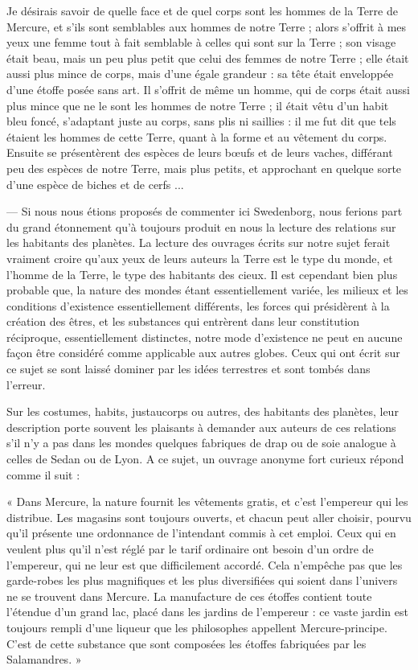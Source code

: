 \documentclass[a4paper, 11pt, oneside]{article}
\begin{document}
Je désirais savoir de quelle face et de quel corps sont les hommes de la Terre de Mercure, et s'ils sont semblables aux hommes de notre Terre ; alors s'offrit à mes yeux une femme tout à fait semblable à celles qui sont sur la Terre ; son visage était beau, mais un peu plus petit que celui des femmes de notre Terre ; elle était aussi plus mince de corps, mais d'une égale grandeur : sa tête était enveloppée d'une étoffe posée sans art. Il s'offrit de même un homme, qui de corps était aussi plus mince que ne le sont les hommes de notre Terre ; il était vêtu d'un habit bleu foncé, s'adaptant juste au corps, sans plis ni saillies : il me fut dit que tels étaient les hommes de cette Terre, quant à la forme et au vêtement du corps. Ensuite se présentèrent des espèces de leurs bœufs et de leurs vaches, différant peu des espèces de notre Terre, mais plus petits, et approchant en quelque sorte d'une espèce de biches et de cerfs ...

--- Si nous nous étions proposés de commenter ici Swedenborg, nous ferions part du grand étonnement qu'à toujours produit en nous la lecture des relations sur les habitants des planètes. La lecture des ouvrages écrits sur notre sujet ferait vraiment croire qu'aux yeux de leurs auteurs la Terre est le type du monde, et l'homme de la Terre, le type des habitants des cieux. Il est cependant bien plus probable que, la nature des mondes étant essentiellement variée, les milieux et les conditions d'existence essentiellement différents, les forces qui présidèrent à la création des êtres, et les substances qui entrèrent dans leur constitution réciproque, essentiellement distinctes, notre mode d'existence ne peut en aucune façon être considéré comme applicable aux autres globes. Ceux qui ont écrit sur ce sujet se sont laissé dominer par les idées terrestres et sont tombés dans l'erreur.

Sur les costumes, habits, justaucorps ou autres, des habitants des planètes, leur description porte souvent les plaisants à demander aux auteurs de ces relations s'il n'y a pas dans les mondes quelques fabriques de drap ou de soie analogue à celles de Sedan ou de Lyon. A ce sujet, un ouvrage anonyme fort curieux répond comme il suit :

« Dans Mercure, la nature fournit les vêtements gratis, et c'est l'empereur qui les distribue. Les magasins sont toujours ouverts, et chacun peut aller choisir, pourvu qu'il présente une ordonnance de l'intendant commis à cet emploi. Ceux qui en veulent plus qu'il n'est réglé par le tarif ordinaire ont besoin d'un ordre de l'empereur, qui ne leur est que difficilement accordé. Cela n'empêche pas que les garde-robes les plus magnifiques et les plus diversifiées qui soient dans l'univers ne se trouvent dans Mercure. La manufacture de ces étoffes contient toute l'étendue d'un grand lac, placé dans les jardins de l'empereur : ce vaste jardin est toujours rempli d'une liqueur que les philosophes appellent Mercure-principe. C'est de cette substance que sont composées les étoffes fabriquées par les Salamandres. »
\end{document}
